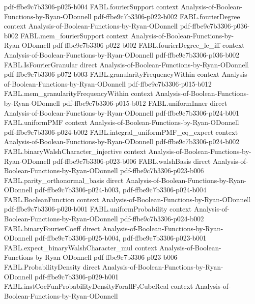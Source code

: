 \begin{theorem}
  {pdf-ffbe9c7b3306-p025-b004}
\proofstep
  {FABL.fourierSupport}
  {context}
  {Analysis-of-Boolean-Functions-by-Ryan-ODonnell}
  {pdf-ffbe9c7b3306-p022-b002}
\proofstep
  {FABL.fourierDegree}
  {context}
  {Analysis-of-Boolean-Functions-by-Ryan-ODonnell}
  {pdf-ffbe9c7b3306-p036-b002}
\proofstep
  {FABL.mem_fourierSupport}
  {context}
  {Analysis-of-Boolean-Functions-by-Ryan-ODonnell}
  {pdf-ffbe9c7b3306-p022-b002}
\proofstep
  {FABL.fourierDegree_le_iff}
  {context}
  {Analysis-of-Boolean-Functions-by-Ryan-ODonnell}
  {pdf-ffbe9c7b3306-p036-b002}
\proofstep
  {FABL.IsFourierGranular}
  {direct}
  {Analysis-of-Boolean-Functions-by-Ryan-ODonnell}
  {pdf-ffbe9c7b3306-p072-b003}
\proofstep
  {FABL.granularityFrequencyWithin}
  {context}
  {Analysis-of-Boolean-Functions-by-Ryan-ODonnell}
  {pdf-ffbe9c7b3306-p015-b012}
\proofstep
  {FABL.mem_granularityFrequencyWithin}
  {context}
  {Analysis-of-Boolean-Functions-by-Ryan-ODonnell}
  {pdf-ffbe9c7b3306-p015-b012}
\proofstep
  {FABL.uniformInner}
  {direct}
  {Analysis-of-Boolean-Functions-by-Ryan-ODonnell}
  {pdf-ffbe9c7b3306-p024-b001}
\proofstep
  {FABL.uniformPMF}
  {context}
  {Analysis-of-Boolean-Functions-by-Ryan-ODonnell}
  {pdf-ffbe9c7b3306-p024-b002}
\proofstep
  {FABL.integral_uniformPMF_eq_expect}
  {context}
  {Analysis-of-Boolean-Functions-by-Ryan-ODonnell}
  {pdf-ffbe9c7b3306-p024-b002}
\proofstep
  {FABL.binaryWalshCharacter_injective}
  {context}
  {Analysis-of-Boolean-Functions-by-Ryan-ODonnell}
  {pdf-ffbe9c7b3306-p023-b006}
\proofstep
  {FABL.walshBasis}
  {direct}
  {Analysis-of-Boolean-Functions-by-Ryan-ODonnell}
  {pdf-ffbe9c7b3306-p023-b006}
\proofstep
  {FABL.parity_orthonormal_basis}
  {direct}
  {Analysis-of-Boolean-Functions-by-Ryan-ODonnell}
  {pdf-ffbe9c7b3306-p024-b003,
    pdf-ffbe9c7b3306-p024-b004}
\proofstep
  {FABL.BooleanFunction}
  {context}
  {Analysis-of-Boolean-Functions-by-Ryan-ODonnell}
  {pdf-ffbe9c7b3306-p020-b001}
\proofstep
  {FABL.uniformProbability}
  {context}
  {Analysis-of-Boolean-Functions-by-Ryan-ODonnell}
  {pdf-ffbe9c7b3306-p024-b002}
\proofstep
  {FABL.binaryFourierCoeff}
  {direct}
  {Analysis-of-Boolean-Functions-by-Ryan-ODonnell}
  {pdf-ffbe9c7b3306-p025-b004,
    pdf-ffbe9c7b3306-p023-b001}
\proofstep
  {FABL.expect_binaryWalshCharacter_mul}
  {context}
  {Analysis-of-Boolean-Functions-by-Ryan-ODonnell}
  {pdf-ffbe9c7b3306-p023-b006}
\proofstep
  {FABL.ProbabilityDensity}
  {direct}
  {Analysis-of-Boolean-Functions-by-Ryan-ODonnell}
  {pdf-ffbe9c7b3306-p029-b001}
\proofstep
  {FABL.instCoeFunProbabilityDensityForallF₂CubeReal}
  {context}
  {Analysis-of-Boolean-Functions-by-Ryan-ODonnell}

\end{theorem}
